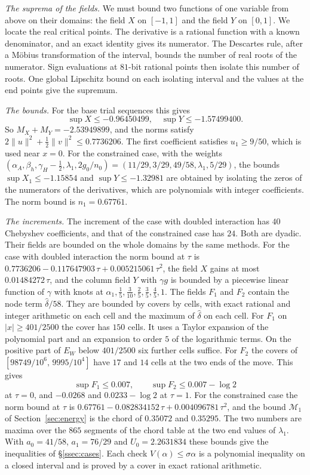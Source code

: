 \documentclass[11pt]{amsart}
\newcommand{\Uzero}{2.2631834}
\newcommand{\SupX}{-0.96450499}
\newcommand{\SupY}{-1.57499400}
\newcommand{\FieldCap}{-2.53949899}
\theoremstyle{definition}
\theoremstyle{remark}
\numberwithin{equation}{section}
\begin{document}
\emph{The suprema of the fields.} We must bound two functions of one variable from above on their domains: the
field $X$ on $[-1,1]$ and the field $Y$ on $[0,1]$. We locate the real
critical points. The derivative is a rational function with a known denominator, and an exact identity gives its
numerator. The Descartes rule, after a M\"obius transformation of the interval, bounds the number of real roots
of the numerator. Sign evaluations at $81$-bit rational points then isolate this number of roots. One global Lipschitz
bound on each isolating interval and the values at the end points give the supremum.

\emph{The bounds.} For the base trial sequences this gives
\[
 \sup X\le\SupX,\quad \sup Y\le\SupY .
\]
So $M_X+M_Y=\FieldCap$, and the norms satisfy $2\|u\|^2+\frac12\|v\|^2\le0.7736206$. The first coefficient satisfies
$u_1\ge9/50$, which is used near $x=0$. For the constrained case, with the weights
$(\alpha_A,\beta_h,\gamma_H-\frac12,\lambda_1,2g_0/n_0)=(11/29,3/29,49/58,\lambda_1,5/29)$, the bounds
$\sup X_1\le-1.15854$ and $\sup Y\le-1.32981$ are obtained by isolating the zeros of the numerators of the
derivatives, which are polynomials with integer coefficients. The norm bound is $n_1=0.67761$.

\emph{The increments.} The increment of the case with doubled interaction has $40$ Chebyshev coefficients, and
that of the constrained case has $24$. Both are dyadic. Their fields are bounded on the whole domains by the
same methods. For the case with doubled interaction the norm bound at $\tau$ is $0.7736206-0.117647903\,\tau+0.005215061\,\tau^2$,
the field $X$ gains at most $0.01484272\,\tau$, and the column field $Y$ with $\gamma g$ is bounded by a piecewise
linear function of $\gamma$ with knots at $\alpha_1,\frac15,\frac3{10},\frac25,\frac35,\frac45,1$. The fields $F_1$ and $F_2$
contain the node term $\hat\delta/58$. They are bounded by covers by cells, with exact rational and integer arithmetic on each cell
and the maximum of $\hat\delta$ on each cell. For $F_1$ on $|x|\ge401/2500$ the cover has $150$ cells. It uses a Taylor expansion of the
polynomial part and an expansion to order $5$ of the logarithmic terms. On the positive part of $E_W$ below $401/2500$ six
further cells suffice. For $F_2$ the covers of $[98749/10^6,\,9995/10^4]$ have $17$ and $14$ cells at the two ends of the move. This gives
\[
 \sup F_1\le0.007,\qquad \sup F_2\le0.007-\log2
\]
at $\tau=0$, and $-0.0268$ and $0.0233-\log2$ at $\tau=1$. For the constrained case the norm bound at $\tau$ is
$0.67761-0.082834152\,\tau+0.004096781\,\tau^2$, and the bound $\mathcal M_1$ of Section~\ref{sec:energy} is the chord of
$0.35072$ and $0.35295$. The two numbers are maxima over the $865$ segments of the chord table at the two end values of
$\lambda_1$. With $a_0=41/58$, $a_1=76/29$ and $U_0=\Uzero$ these bounds give the inequalities of \S\ref{ssec:cases}.
Each check $V(\alpha)\le\sigma\alpha$ is a polynomial inequality on a closed interval and is proved by a cover in exact
rational arithmetic.
\end{document}

